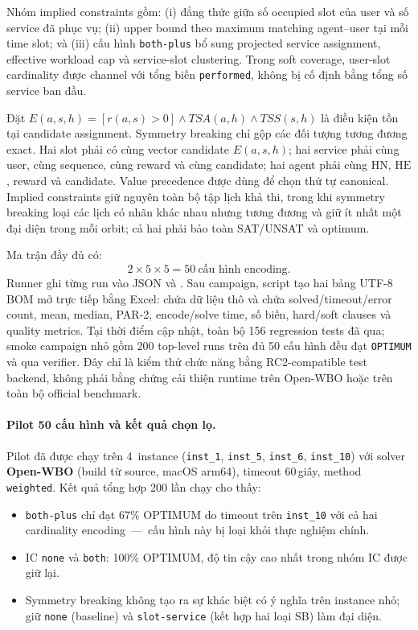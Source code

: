 \documentclass[12pt,a4paper]{article}
\newcommand{\HN}{\mathrm{HN}}
\newcommand{\HE}{\mathrm{HE}}
\begin{document}
Nhóm implied constraints gồm: (i) đẳng thức giữa số occupied slot của user và
số service đã phục vụ; (ii) upper bound theo maximum matching agent--user tại
mỗi time slot; và (iii) cấu hình \texttt{both-plus} bổ sung projected service
assignment, effective workload cap và service-slot clustering. Trong soft
coverage, user-slot cardinality được channel với tổng biến
\texttt{performed}, không bị cố định bằng tổng số service ban đầu.

Đặt $E(a,s,h)=[r(a,s)>0]\land TSA(a,h)\land TSS(s,h)$ là điều kiện tồn tại
candidate assignment.
Symmetry breaking chỉ gộp các đối tượng tương đương exact. Hai slot phải có
cùng vector candidate $E(a,s,h)$; hai service phải cùng user, cùng sequence,
cùng reward và cùng candidate; hai agent phải cùng $\HN$, $\HE$, reward và
candidate. Value precedence được dùng để chọn thứ tự canonical. Implied
constraints giữ nguyên toàn bộ tập lịch khả thi, trong khi symmetry breaking
loại các lịch có nhãn khác nhau nhưng tương đương và giữ ít nhất một đại diện
trong mỗi orbit; cả hai phải bảo toàn SAT/UNSAT và optimum.

Ma trận đầy đủ có:
\begin{equation}
  2\times5\times5=50\ \text{cấu hình encoding}.
\end{equation}
Runner ghi từng run vào JSON và . Sau campaign, script
 tạo hai bảng UTF-8 BOM mở trực tiếp bằng Excel:
 chứa dữ liệu thô và  chứa
solved/timeout/error count, mean, median, PAR-2, encode/solve time, số biến,
hard/soft clauses và quality metrics. Tại thời điểm cập nhật, toàn bộ
156 regression tests đã qua; smoke campaign nhỏ gồm 200 top-level runs trên đủ
50 cấu hình đều đạt \texttt{OPTIMUM} và qua verifier. Đây chỉ là kiểm thử chức
năng bằng RC2-compatible test backend, không phải bằng chứng cải thiện runtime
trên Open-WBO hoặc trên toàn bộ official benchmark.

\paragraph{Pilot 50 cấu hình và kết quả chọn lọ.}
Pilot đã được chạy trên 4~instance (\texttt{inst\_1}, \texttt{inst\_5},
\texttt{inst\_6}, \texttt{inst\_10}) với solver \textbf{Open-WBO}
(build từ source, macOS arm64), timeout 60\,giây, method \texttt{weighted}.
Kết quả tổng hợp 200 lần chạy cho thấy:
\begin{itemize}
  \item \texttt{both-plus} chỉ đạt 67\% OPTIMUM do timeout trên
    \texttt{inst\_10} với cả hai cardinality encoding ---\
    cấu hình này bị loại khỏi thực nghiệm chính.
  \item IC \texttt{none} và \texttt{both}: 100\% OPTIMUM, độ tin cậy cao nhất
    trong nhóm IC được giữ lại.
  \item Symmetry breaking không tạo ra sự khác biệt có ý nghĩa trên
    instance nhỏ; giữ \texttt{none} (baseline) và
    \texttt{slot-service} (kết hợp hai loại SB) làm đại diện.
\end{itemize}
\end{document}
